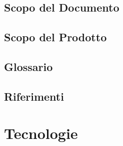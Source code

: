 \documentclass[5pt]{article}
\begin{document}
	\subsection{Scopo del Documento}
	
	\subsection{Scopo del Prodotto}
	
	\subsection{Glossario}
	
	\subsection{Riferimenti}
	
	\section{Tecnologie}
	
\end{document}
